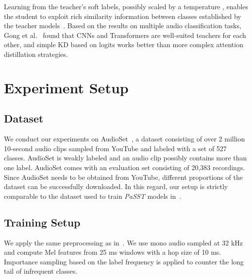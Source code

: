 \documentclass{article}
\begin{document}
Learning from the teacher's soft labels, possibly scaled by a temperature , enables the student to exploit rich similarity information between classes established by the teacher models~\cite{Hinton2015distilling}. 
Based on the results on multiple audio classification tasks, Gong et al.~\cite{Gong22CMKD} found that CNNs and Transformers are well-suited teachers for each other, and simple KD based on logits works better than more complex attention distillation strategies.











\vspace{-6pt}
\section{Experiment Setup}
\label{sec:exp_set}
\vspace{-6pt}
\subsection{Dataset}
\vspace{-4pt}
We conduct our experiments on AudioSet~\cite{audioset2017Gemmeke}, a dataset consisting of over 2 million 10-second audio clips sampled from YouTube and labeled with a set of 527 classes. AudioSet is weakly labeled and an audio clip possibly contains more than one label. AudioSet comes with an evaluation set consisting of 20,383 recordings. Since AudioSet needs to be obtained from YouTube, different proportions of the dataset can be successfully downloaded. In this regard, our setup is strictly comparable to the dataset used to train \textit{PaSST} models in~\cite{Koutini21Passt}. 








\vspace{-6pt}
\subsection{Training Setup}
\vspace{-4pt}
\label{subsec:preprocessing}
We apply the same preprocessing as in~\cite{Koutini21Passt}. We use mono audio sampled at 32 kHz and compute Mel features from 25 ms windows with a hop size of 10 ms. Importance sampling based on the label frequency is applied to counter the long tail of infrequent classes. 
\end{document}
